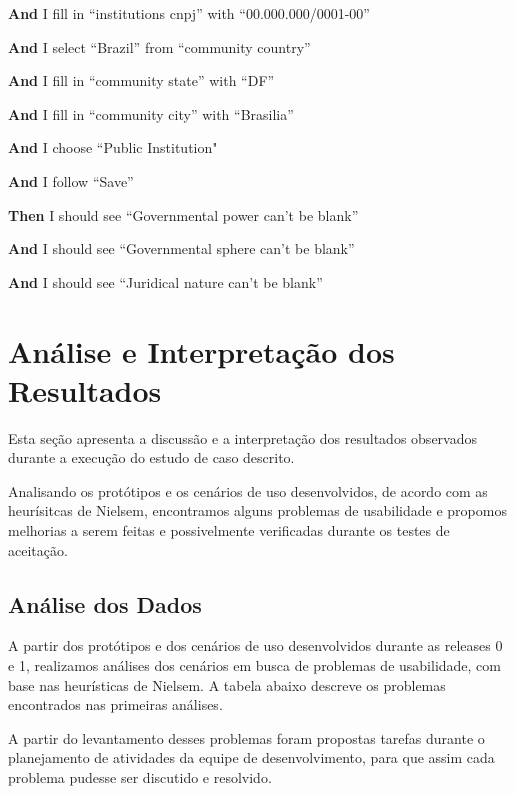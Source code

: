     \textbf{And }I fill in ``institutions cnpj'' with ``00.000.000/0001-00''

    \textbf{And }I select ``Brazil'' from ``community country''

    \textbf{And }I fill in ``community state'' with ``DF''

    \textbf{And }I fill in ``community city'' with ``Brasilia''

    \textbf{And }I choose ``Public Institution"

    \textbf{And }I follow ``Save''

    \textbf{Then} I should see ``Governmental power can't be blank''

    \textbf{And }I should see ``Governmental sphere can't be blank''

    \textbf{And }I should see ``Juridical nature can't be blank''


  

\section{Análise e Interpretação dos Resultados}

Esta seção apresenta a discussão e a interpretação dos resultados observados durante a execução do estudo de caso descrito.

Analisando os protótipos e os cenários de uso desenvolvidos, de acordo com as heurísitcas de Nielsem, encontramos alguns problemas de usabilidade e propomos melhorias a serem feitas e possivelmente verificadas durante os testes de aceitação.

\subsection{Análise dos Dados}

A partir dos protótipos e dos cenários de uso desenvolvidos durante as releases 0 e 1, realizamos análises dos cenários em busca de problemas de usabilidade, com base nas heurísticas de Nielsem. A tabela abaixo descreve os problemas encontrados nas primeiras análises.

A partir do levantamento desses problemas foram propostas tarefas durante o planejamento de atividades da equipe de desenvolvimento, para que assim cada problema pudesse ser discutido e resolvido.



